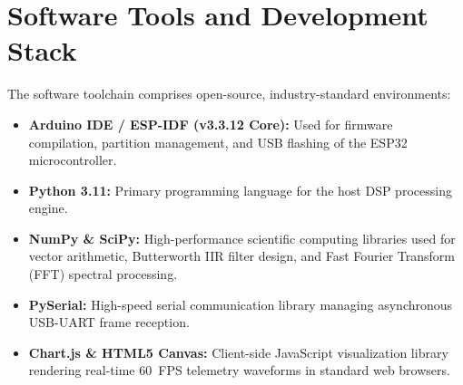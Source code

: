 \section{Software Tools and Development Stack}
The software toolchain comprises open-source, industry-standard environments:
\begin{itemize}
    \item \textbf{Arduino IDE / ESP-IDF (v3.3.12 Core):} Used for firmware compilation, partition management, and USB flashing of the ESP32 microcontroller.
    \item \textbf{Python 3.11:} Primary programming language for the host DSP processing engine.
    \item \textbf{NumPy \& SciPy:} High-performance scientific computing libraries used for vector arithmetic, Butterworth IIR filter design, and Fast Fourier Transform (FFT) spectral processing.
    \item \textbf{PySerial:} High-speed serial communication library managing asynchronous USB-UART frame reception.
    \item \textbf{Chart.js \& HTML5 Canvas:} Client-side JavaScript visualization library rendering real-time 60~FPS telemetry waveforms in standard web browsers.
\end{itemize}
